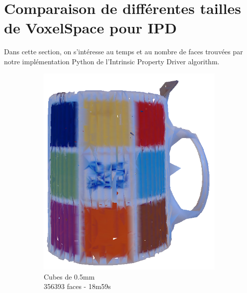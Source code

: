 \documentclass[a4paper,10pt]{report}
\begin{document}
\section{Comparaison de différentes tailles de VoxelSpace pour IPD}
Dans cette section, on s'intéresse au temps et au nombre de faces trouvées par notre implémentation Python de l'Intrinsic Property Driver algorithm.

\begin{figure}[h!]
	\centering
    \begin{subfigure}[b]{0.3\textwidth}
	    \includegraphics[width=\textwidth]{results/vs05-ipd.png}
        \caption{Cubes de 0.5mm\\356393 faces - 18m59s}
    \end{subfigure}
    \begin{subfigure}[b]{0.3\textwidth}

\end{subfigure}
\end{figure}
\end{document}
